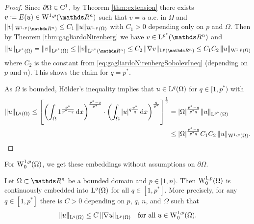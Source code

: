 \begin{proof}
  Since $\partial \Omega \in \mathrm{C}^1$, by Theorem \ref{thm:extension} there exists $v \coloneqq E(u) \in \WW^{1,p}(\R^n)$ such that $v = u$ a.e. in $\Omega$ and $\|v\|_{\WW^{1,p}(\R^n)} \leq C_1 \, \|u\|_{\WW^{1,p}(\Omega)}$ with $C_1 > 0$ depending only on $p$ and $\Omega$.
  Then by Theorem \ref{thm:gagliardoNirenberg} we have $v \in \Ell^{p^*}(\R^n)$ and
  $$
  \| u\|_{\Ell^{p^*}(\Omega)} = \|v\|_{\Ell^{p^*}(\Omega)} \leq \|v\|_{\Ell^{p^*}(\R^n)} \leq C_2 \, \|\nabla v\|_{\Ell^p(\R^n)} \leq C_1 C_2 \, \|u\|_{\WW^{1,p}(\Omega)}
  $$
  where $C_2$ is the constant from \eqref{eq:gagliardoNirenbergSobolevIneq} (depending on $p$ and $n$).
  This shows the claim for $q = p^*$.

  As $\Omega$ is bounded, Hölder's inequality implies that $u \in \mathrm{L}^q(\Omega)$ for $q \in [1,p^*)$ with
  \begin{align}
    \label{eq:embeddingpltn}
    \|u\|_{\mathrm{L}^q(\Omega)}
     \leq \left[ \left( \int_\Omega 1^{\frac{p^*}{p^* - q}} \, {\operatorname{d}\!{x}} \right)^{\frac{p^* - q}{p^*}} \cdot \left( \int_\Omega |u|^{q  \frac{p^*}{q}} \, {\operatorname{d}\!{x}} \right)^{\frac{q}{p^*}} \right]^{\frac{1}{q}} 
    &= |\Omega|^{\frac{p^* - q}{p^* q}} \|u\|_{\mathrm{L}^{p^*}(\Omega)} \\
    &  \leq |\Omega|^{\frac{p^* - q}{p^* q}} C_1 C_2 \, \|u\|_{\mathrm{W}^{1,p}(\Omega)}.\nonumber\qedhere
  \end{align}
\end{proof}

For $\mathrm{W}_0^{1,p}(\Omega)$, we get these embeddings without assumptions on $\partial\Omega$.

\begin{thm}[Embeddings for $\WW_0^{1,p}(\Omega), p < n$]
  Let $\Omega \subset \R^n$ be a bounded domain and $p \in [1,n)$.
    Then $\mathrm{W}_0^{1,p}(\Omega)$ is continuously embedded into $\mathrm{L}^q(\Omega)$ for all $q \in [1,p^*]$.
    More precisely, for any $q \in [1,p^*]$ there is $C > 0$ depending on $p$, $q$, $n$, and $\Omega$ such that
    \begin{equation}
      \label{eq:gagliardoNirenbergBounded}
      \|u\|_{\mathrm{L}^q(\Omega)} \leq C \, \|\nabla u\|_{\mathrm{L}^p(\Omega)} \quad\text{for all } u \in \mathrm{W}_0^{1,p}(\Omega).
    \end{equation}
\end{thm}

